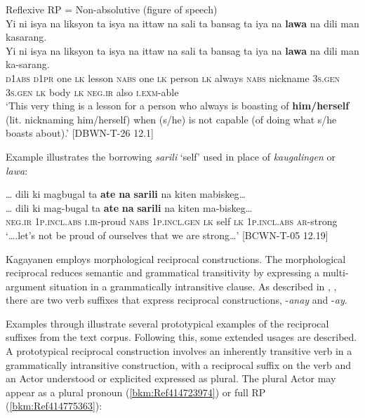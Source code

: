 \ea
\label{bkm:Ref118699324}
Reflexive RP = Non-absolutive (figure of speech) \\
Yi ni  isya  na  liksyon  ta  isya  na  ittaw  na  sali  ta  bansag  ta iya  na  \textbf{lawa}  na  dili  man  kasarang. \\\smallskip
\gll Yi ni  isya  na  liksyon  ta  isya  na  ittaw  na  sali  ta  bansag  ta iya  na  \textbf{lawa}  na  dili  man  ka-sarang. \\
\textsc{d1abs} \textsc{d1pr}  one  \textsc{lk}  lesson  \textsc{nabs}  one  \textsc{lk}  person  \textsc{lk} always \textsc{nabs}  nickname  3\textsc{s.gen}
3\textsc{s.gen}  \textsc{lk}  body  \textsc{lk}  \textsc{neg.ir} also \textsc{i.exm}-able \\
\glt `This very thing is a lesson for a person who always is boasting of \textbf{him/herself} (lit. nicknaming him/herself) when (s/he) is not capable (of doing what s/he boasts about).’ [DBWN-T-26 12.1]
\z

Example  illustrates the  borrowing \textit{sarili} ‘self’ used in place of \textit{kaugalingen} or \textit{lawa}:

\ea
\label{bkm:Ref118618209}
… dili  ki  magbugal  ta  \textbf{ate}  \textbf{na}  \textbf{sarili}  na  kiten mabiskeg… \\\smallskip
\gll … dili  ki  mag-bugal  ta  \textbf{ate}  \textbf{na}  \textbf{sarili}  na  kiten ma-biskeg… \\
{} \textsc{neg.ir}  1\textsc{p.incl.abs}  \textsc{i.ir}-proud  \textsc{nabs}  1\textsc{p.incl.gen}  \textsc{lk}  self  \textsc{lk} 1\textsc{p.incl.abs}
\textsc{ar}-strong \\
\glt `….let’s not be proud of ourselves that we are strong…’ [BCWN-T-05 12.19]
\z

Kagayanen employs morphological reciprocal constructions. The morphological reciprocal reduces semantic and grammatical transitivity by expressing a multi-argument situation in a grammatically intransitive clause. As described in , , there are two verb suffixes that express reciprocal constructions, -\textit{anay} and -\textit{ay}.

Examples  through  illustrate several prototypical examples of the reciprocal suffixes from the text corpus. Following this, some extended usages are described. A prototypical reciprocal construction involves an inherently transitive verb in a grammatically intransitive construction, with a reciprocal suffix on the verb and an Actor understood or explicited expressed as plural. The plural Actor may appear as a plural pronoun (\ref{bkm:Ref414723974}) or full RP (\ref{bkm:Ref414775363}):

